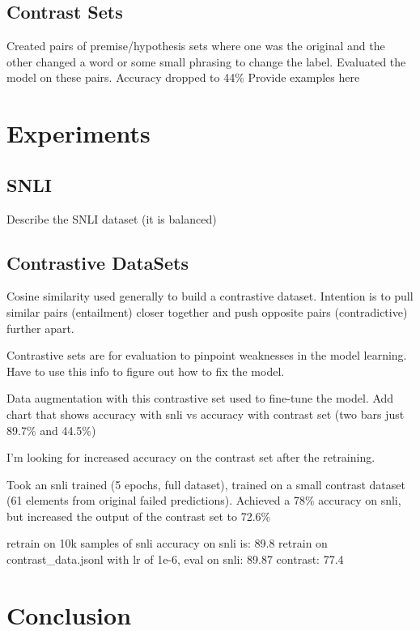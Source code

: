 \documentclass[11pt]{article}
\begin{document}
\subsection{Contrast Sets}
Created pairs of premise/hypothesis sets where one was the original and the other changed a word or some small phrasing to change the label. Evaluated the model on these pairs. Accuracy dropped to 44\%  Provide examples here

\section{Experiments}
\subsection{SNLI}

Describe the SNLI dataset (it is balanced) \cite{dataAug}
\subsection{Contrastive DataSets}

Cosine similarity used generally to build a contrastive dataset. Intention is to pull similar pairs (entailment) closer together and push opposite pairs (contradictive) further apart.

Contrastive sets are for evaluation to pinpoint weaknesses in the model learning. Have to use this info to figure out how to fix the model.

Data augmentation with this contrastive set used to fine-tune the model.
Add chart that shows accuracy with snli vs accuracy with contrast set (two bars just 89.7\% and 44.5\%)

I'm looking for increased accuracy on the contrast set after the retraining.

Took an snli trained (5 epochs, full dataset), trained on a small contrast dataset (61 elements from original failed predictions).  Achieved a 78\% accuracy on snli, but increased the output of the contrast set to 72.6\%

retrain on 10k samples of snli accuracy on snli is: 89.8
retrain on contrast_data.jsonl with lr of 1e-6, eval on snli: 89.87  contrast: 77.4

\section{Conclusion}



\end{document}
